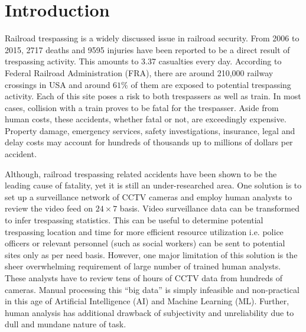 \section{Introduction}
Railroad trespassing is a widely discussed issue in railroad security. From 2006 to 2015, 2717 deaths and 9595 injuries have been reported to be a direct result of trespassing activity\cite{zhang2018automated}. This amounts to 3.37 casualties every day. According to Federal Railroad Administration (FRA), there are around 210,000 railway crossings in USA and around $61\%$ of them are exposed to potential trespassing activity\cite{zhang2018automated}. Each of this site poses a risk to both trespassers as well as train. In most cases, collision with a train proves to be fatal for the trespasser. Aside from human costs, these accidents, whether fatal or not, are exceedingly expensive. Property damage, emergency services, safety investigations, insurance, legal and delay costs may account for hundreds of thousands up to millions of dollars per accident\cite{goldberg1998train}. 

Although, railroad trespassing related accidents have been shown to be the leading cause of fatality\cite{pelletier1997deaths,matzopoulos1998hours,lobb2003evaluation,evans2003accidental}, yet it is still an under-researched area\cite{lobb2006trespassing}. One solution is to set up a surveillance network of CCTV cameras and employ human analysts to review the video feed on $24 \times 7$
basis. Video surveillance data can be transformed to infer trespassing statistics. This can be useful to determine potential trespassing location and time for more efficient resource utilization i.e. police officers or relevant personnel (such as social workers) can be sent to potential sites only as per need basis. However, one major limitation of this solution is the sheer overwhelming requirement of large number of trained human analysts. These analysts have to review tens of hours of CCTV data from hundreds of cameras. Manual processing this ``big data'' is simply infeasible and non-practical in this age of Artificial Intelligence (AI) and Machine Learning (ML). Further, human analysis has additional drawback of subjectivity and unreliability due to dull and mundane nature of task\cite{norouznezhad2008high}.


